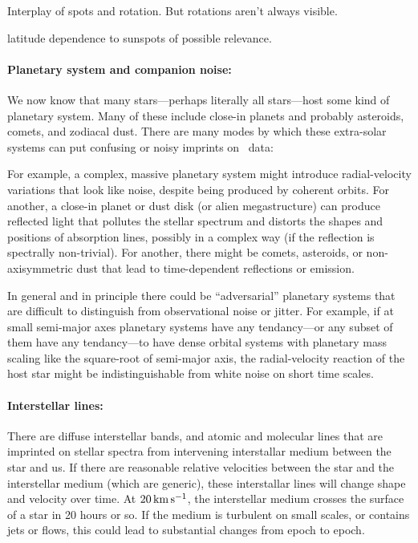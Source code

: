 \documentclass[12pt, fullpage, letterpaper]{article}
\begin{document}
Interplay of spots and rotation. But rotations aren't always visible.

latitude dependence to sunspots of possible relevance.

\paragraph{Planetary system and companion noise:}
We now know that many stars---perhaps literally all stars---host some
kind of planetary system.
Many of these include close-in planets and probably asteroids, comets,
and zodiacal dust.
There are many modes by which these extra-solar systems can put
confusing or noisy imprints on \EPRV\ data:

For example, a complex, massive planetary system might introduce
radial-velocity variations that look like noise, despite being
produced by coherent orbits.
For another, a close-in planet or dust disk (or alien
megastructure) can produce reflected light that pollutes the stellar
spectrum and distorts the shapes and positions of absorption lines,
possibly in a complex way (if the reflection is spectrally
non-trivial).
For another, there might be comets, asteroids, or non-axisymmetric
dust that lead to time-dependent reflections or emission.

In general and in principle there could be ``adversarial'' planetary
systems that are difficult to distinguish from observational noise or
jitter.
For example,
if at small semi-major axes planetary systems have any tendancy---or
any subset of them have any tendancy---to have dense orbital systems
with planetary mass scaling like the square-root of semi-major axis,
the radial-velocity reaction of the host star might be indistinguishable
from white noise on short time scales.

\paragraph{Interstellar lines:}
There are diffuse interstellar bands, and atomic and molecular lines
that are imprinted on stellar spectra from intervening interstallar
medium between the star and us.
If there are reasonable relative velocities between the star and the
interstellar medium (which are generic), these interstallar lines will
change shape and velocity over time.
At $20\,{\mathrm{km\,s^{-1}}}$, the interstellar medium crosses the surface of a star
in 20 hours or so. If the medium is turbulent on small scales, or contains
jets or flows, this
could lead to substantial changes from epoch to epoch.
\end{document}
